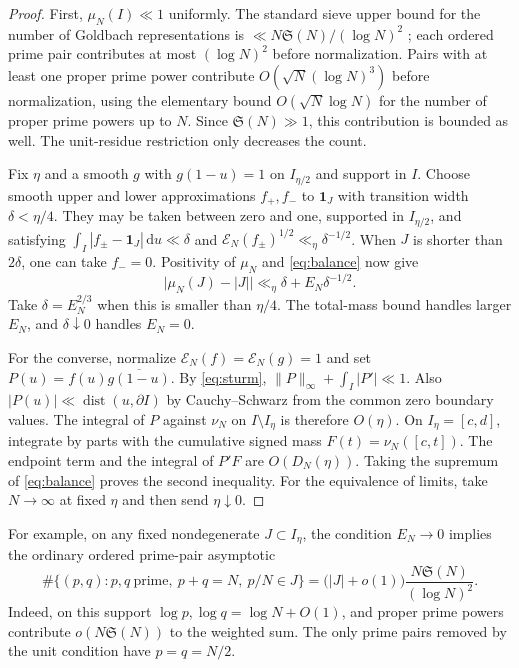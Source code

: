 \documentclass[11pt,a4paper]{article}
\numberwithin{equation}{section}
\newcommand{\SSS}{\mathfrak S}
\newcommand{\ud}{\mathrm d}
\newcommand{\E}{\mathcal E_N}
\newcommand{\dd}{\operatorname{dist}}
\begin{document}
\begin{proof}
First, $\mu_N(I)\ll1$ uniformly. The standard sieve upper bound for the
number of Goldbach representations is $\ll N\SSS(N)/(\log N)^2$
\cite[Theorem~1.2]{Lichtman}; each ordered prime pair contributes at most
$(\log N)^2$ before normalization. Pairs with at least one proper prime
power contribute $O(\sqrt N(\log N)^3)$ before normalization, using the
elementary bound $O(\sqrt N\log N)$ for the number of proper prime
powers up to $N$. Since $\SSS(N)\gg1$, this contribution is bounded as
well. The unit-residue restriction only decreases the count.

Fix $\eta$ and a smooth $g$ with $g(1-u)=1$ on $I_{\eta/2}$ and support
in $I$. Choose smooth upper and lower approximations $f_+,f_-$ to
$\mathbf 1_J$ with transition width $\delta<\eta/4$. They may be taken
between zero and one, supported in $I_{\eta/2}$, and satisfying
$\int_I |f_\pm-\mathbf 1_J|\,\ud u\ll\delta$ and
$\E(f_\pm)^{1/2}\ll_\eta\delta^{-1/2}$. When $J$ is shorter than
$2\delta$, one can take $f_-=0$. Positivity of $\mu_N$ and
\cref{eq:balance} now give
\[
  \bigl|\mu_N(J)-|J|\bigr|\ll_\eta \delta+E_N\delta^{-1/2}.
\]
Take $\delta=E_N^{2/3}$ when this is smaller than $\eta/4$. The
total-mass bound handles larger $E_N$, and $\delta\downarrow0$ handles
$E_N=0$.

For the converse, normalize $\E(f)=\E(g)=1$ and set
$P(u)=f(u)\overline{g(1-u)}$. By \cref{eq:sturm},
$\|P\|_\infty+\int_I|P'|\ll1$. Also
$|P(u)|\ll\dd(u,\partial I)$ by Cauchy--Schwarz from the common
zero boundary values. The integral of $P$ against $\nu_N$ on
$I\setminus I_\eta$ is therefore $O(\eta)$. On $I_\eta=[c,d]$,
integrate by parts with the cumulative signed mass
$F(t)=\nu_N([c,t])$. The endpoint term and the integral of $P'F$
are $O(D_N(\eta))$. Taking the supremum of \cref{eq:balance} proves
the second inequality. For the equivalence of limits, take $N\to\infty$
at fixed $\eta$ and then send $\eta\downarrow0$.
\end{proof}

For example, on any fixed nondegenerate $J\subset I_\eta$, the
condition $E_N\to0$ implies the ordinary ordered prime-pair
asymptotic
\[
  \#\{(p,q): p,q\ \text{prime},\ p+q=N,\ p/N\in J\}
    =\bigl(|J|+o(1)\bigr)\frac{N\SSS(N)}{(\log N)^2}.
\]
Indeed, on this support $\log p,\log q=\log N+O(1)$, and proper
prime powers contribute $o(N\SSS(N))$ to the weighted sum. The only
prime pairs removed by the unit condition have $p=q=N/2$.
\end{document}
